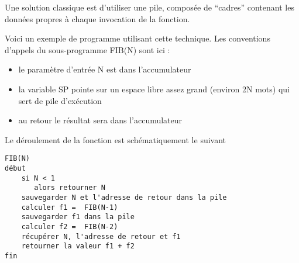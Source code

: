 \documentclass[10pt]{article}
\begin{document}
Une solution classique est d'utiliser une pile, composée de ``cadres''
contenant les données propres à chaque invocation de la fonction.

Voici un exemple de programme utilisant cette technique. Les
conventions d'appels du sous-programme FIB(N) sont ici :

\begin{itemize}
\item le paramètre d'entrée N est dans l'accumulateur
\item la variable SP pointe sur un espace libre assez grand (environ 2N mots)
qui sert de pile d'exécution
\item au retour le résultat sera dans l'accumulateur
\end{itemize}

Le déroulement de la fonction est schématiquement le suivant
\begin{verbatim}
FIB(N)
début
    si N < 1
       alors retourner N
    sauvegarder N et l'adresse de retour dans la pile
    calculer f1 =  FIB(N-1)
    sauvegarder f1 dans la pile
    calculer f2 =  FIB(N-2)
    récupérer N, l'adresse de retour et f1
    retourner la valeur f1 + f2
fin
\end{verbatim}


   
\end{document}
